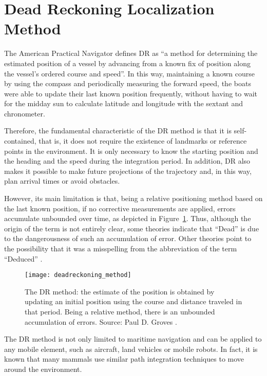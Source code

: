 \section{Dead Reckoning Localization Method}
\label{sec:2_3_DR}

The American Practical Navigator \cite{bowditch_originally_by_american_2017} defines DR as “a method for determining the estimated position of a vessel by advancing from a known fix of position along the vessel’s ordered course and speed”. 
In this way, maintaining a known course by using the compass and periodically measuring the forward speed, the boats were able to update their last known position frequently, without having to wait for the midday sun to calculate latitude and longitude with the sextant and chronometer.

Therefore, the fundamental characteristic of the DR method is that it is self-contained, that is, it does not require the existence of landmarks or reference points in the environment. 
It is only necessary to know the starting position and the heading and the speed during the integration period. 
In addition, DR also makes it possible to make future projections of the trajectory and, in this way, plan arrival times or avoid obstacles.

However, its main limitation is that, being a relative positioning method based on the last known position, if no corrective measurements are applied, errors accumulate unbounded over time, as depicted in Figure~\ref{fig:DR_error}.
Thus, although the origin of the term is not entirely clear, some theories indicate that ``Dead'' is due to the dangerousness
of such an accumulation of error. Other theories point to the possibility that it was a misspelling from the abbreviation of the term ``Deduced'' \cite{quinion_world_2007}.

\begin{figure}[!t]
    \centering
	\texttt{[image: deadreckoning\_method]}    	
	\caption[The Dead Reckoning method]{The DR method: the estimate of the position is obtained by updating an initial position using the course and distance traveled in that period. Being a relative method, there is an unbounded accumulation of errors. Source: Paul D. Groves \cite{groves_principles_2008}.}
	\label{fig:DR_error}
\end{figure}
The DR method is not only limited to maritime navigation and can be applied to any mobile element, such as aircraft, land vehicles or mobile robots. In fact, it is known that many mammals use similar path integration techniques to move around the environment.

